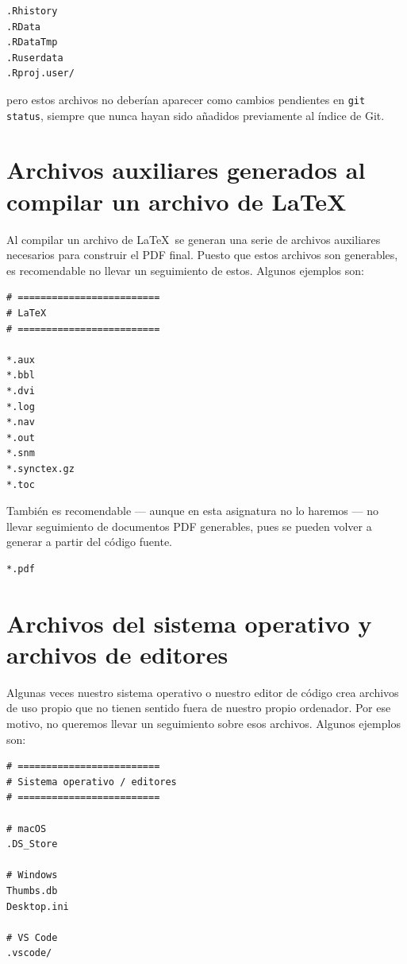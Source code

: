 \documentclass[11pt,a4paper]{article}
\theoremstyle{exercise}
\begin{document}
\begin{lstlisting}[style=mdstyle]
.Rhistory
.RData
.RDataTmp
.Ruserdata
.Rproj.user/
\end{lstlisting}

\noindent pero estos archivos no deberían aparecer como cambios pendientes en \texttt{git status}, siempre que nunca hayan sido añadidos previamente al índice de Git.



\section{Archivos auxiliares generados al compilar un archivo de \LaTeX}

Al compilar un archivo de \LaTeX\ se generan una serie de archivos auxiliares necesarios para construir el PDF final. Puesto que estos archivos son generables, es recomendable no llevar un seguimiento de estos. Algunos ejemplos son:


\begin{lstlisting}[style=mdstyle]
# =========================
# LaTeX
# =========================

*.aux
*.bbl
*.dvi
*.log
*.nav
*.out
*.snm
*.synctex.gz
*.toc
\end{lstlisting}


También es recomendable --- aunque en esta asignatura no lo haremos --- no llevar seguimiento de documentos PDF generables, pues se pueden volver a generar a partir del código fuente.


\begin{lstlisting}[style=mdstyle]
*.pdf
\end{lstlisting}



\section{Archivos del sistema operativo y archivos de editores}


Algunas veces nuestro sistema operativo o nuestro editor de código crea archivos de uso propio que no tienen sentido fuera de nuestro propio ordenador. Por ese motivo, no queremos llevar un seguimiento sobre esos archivos. Algunos ejemplos son:

\begin{lstlisting}[style=mdstyle]
# =========================
# Sistema operativo / editores
# =========================

# macOS
.DS_Store

# Windows
Thumbs.db
Desktop.ini

# VS Code
.vscode/
\end{lstlisting}
\end{document}
